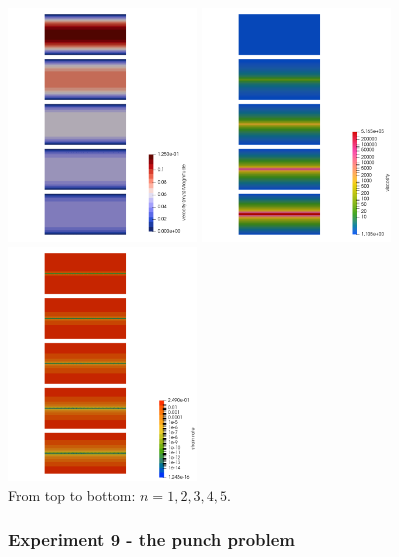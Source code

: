 \begin{center}
\includegraphics[width=5cm]{python_codes/fieldstone_87/results/experiment_08/vel}
\includegraphics[width=5cm]{python_codes/fieldstone_87/results/experiment_08/eta}
\includegraphics[width=5cm]{python_codes/fieldstone_87/results/experiment_08/sr}\\
{\captionfont From top to bottom: $n=1,2,3,4,5$.}
\end{center}

\newpage
\subsubsection*{Experiment 9 - the punch problem}


